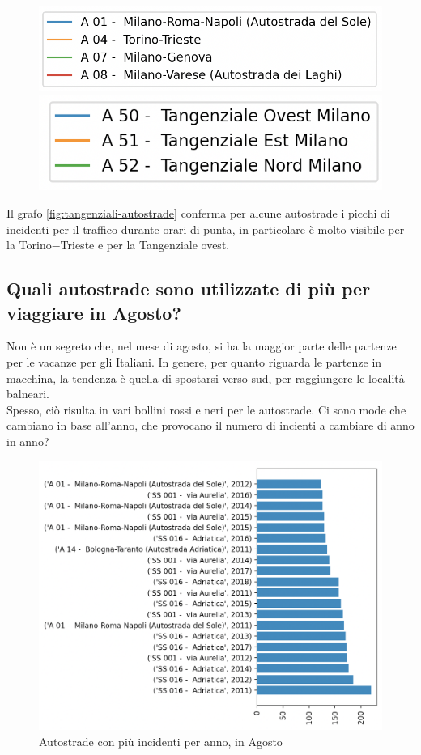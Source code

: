 \documentclass[a4paper]{report}
\begin{document}
\begin{figure}
    \includegraphics[width=0.6\linewidth]{../src/incidenti/incidenti_aci/autostrade/legenda_autostrade.png}
    \includegraphics[width=0.5\linewidth]{../src/incidenti/incidenti_aci/autostrade/legenda_tangenziali.png}
\end{figure}

Il grafo \ref{fig:tangenziali-autostrade} conferma per alcune autostrade i picchi di 
incidenti per il traffico durante orari di punta, 
in particolare è molto visibile per la Torino$-$Trieste e per la Tangenziale ovest.


\subsection{Quali autostrade sono utilizzate di più per viaggiare in Agosto?}

Non è un segreto che, nel mese di agosto, si ha la maggior parte delle partenze per le vacanze per 
gli Italiani. In genere, per quanto riguarda le partenze in macchina, la tendenza è quella di spostarsi verso sud, 
per raggiungere le località balneari.\\
Spesso, ciò risulta in vari bollini rossi e neri per le autostrade. 
Ci sono mode che cambiano in base all'anno, 
che provocano il numero di incienti a cambiare di anno in anno? 

\begin{figure}
    \includegraphics[width=\linewidth]{../src/incidenti/incidenti_aci/agosto/autostrade_anno_agosto.png}
    \caption{Autostrade con più incidenti per anno, in Agosto}
    \label{fig:autostrade-anno-agosto}
\end{figure}
\end{document}
